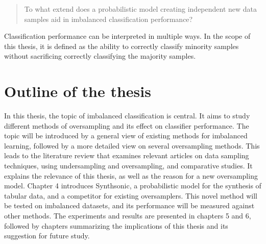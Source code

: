 \begin{quote}
    To what extend does a probabilistic model creating independent new data samples aid in imbalanced classification performance?
\end{quote}

Classification performance can be interpreted in multiple ways. In the scope of this thesis, it is defined as the ability to correctly classify minority samples without sacrificing correctly classifying the majority samples.

\section{Outline of the thesis}
In this thesis, the topic of imbalanced classification is central. It aims to study different methods of oversampling and its effect on classifier performance. The topic will be introduced by a general view of existing methods for imbalanced learning, followed by a more detailed view on several oversampling methods. This leads to the literature review that examines relevant articles on data sampling techniques, using undersampling and oversampling, and comparative studies. It explains the relevance of this thesis, as well as the reason for a new oversampling model. Chapter 4 introduces Synthsonic, a probabilistic model for the synthesis of tabular data, and a competitor for existing oversamplers. This novel method will be tested on imbalanced datasets, and its performance will be measured against other methods. The experiments and results are presented in chapters 5 and 6, followed by chapters summarizing the implications of this thesis and its suggestion for future study.
